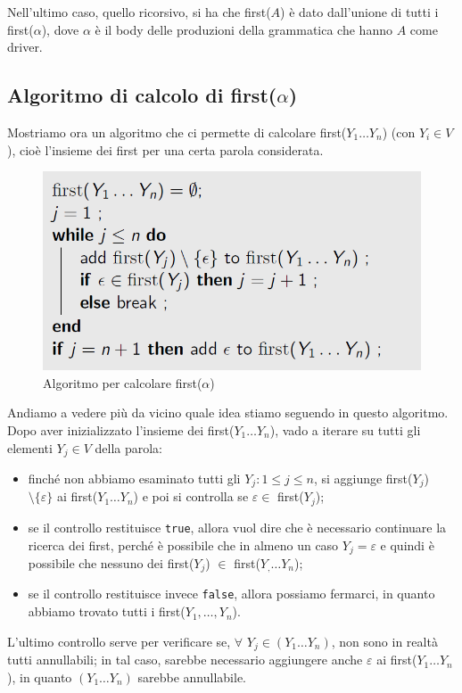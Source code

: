 \documentclass[class=book, crop=false, oneside, 12pt]{standalone}
\begin{document}
    Nell'ultimo caso, quello ricorsivo, si ha che first(\(A\)) è dato dall'unione di tutti i first(\(\alpha\)), dove \(\alpha\) è il body delle produzioni della grammatica che hanno \(A\) come driver.

\subsection{Algoritmo di calcolo di first(\(\alpha\))}

Mostriamo ora un algoritmo che ci permette di calcolare first(\(Y_1 \ldots Y_n\)) (con \(Y_i \in V\)), cioè l'insieme dei first per una certa parola considerata.

\begin{figure}[H]
    \centering
    \includegraphics[width=.7\textwidth,keepaspectratio]{first-algorithm.png}
    \caption{Algoritmo per calcolare first(\(\alpha\))}
    \label{first-algorithm}
\end{figure}

Andiamo a vedere più da vicino quale idea stiamo seguendo in questo algoritmo. Dopo aver inizializzato l'insieme dei first(\(Y_1 \ldots Y_n\)), vado a iterare su tutti gli elementi \(Y_j \in V\) della parola: 
\begin{itemize}
    \item finché non abbiamo esaminato tutti gli \(Y_j : 1 \leq j \leq n\), si aggiunge first(\(Y_j\)) \(\setminus\{\varepsilon\}\) ai first(\(Y_1 \ldots Y_n\)) e poi si controlla se \(\varepsilon \in\) first(\(Y_j\));
    \item se il controllo restituisce \texttt{true}, allora vuol dire che è necessario continuare la ricerca dei first, perché è possibile che in almeno un caso \(Y_j = \varepsilon\) e quindi è possibile che nessuno dei first(\(Y_j\)) \(\in\) first(\(Y_, \ldots Y_n\));
    \item se il controllo restituisce invece \texttt{false}, allora possiamo fermarci, in quanto abbiamo trovato tutti i first(\(Y_1, \ldots, Y_n\)).
\end{itemize} 
L'ultimo controllo serve per verificare se, \(\forall\) \( Y_j \in (Y_1 \ldots Y_n)\), non sono in realtà tutti annullabili; in tal caso, sarebbe necessario aggiungere anche \(\varepsilon\) ai first(\(Y_1 \ldots Y_n\)), in quanto \((Y_1 \ldots Y_n)\) sarebbe annullabile.
\end{document}
